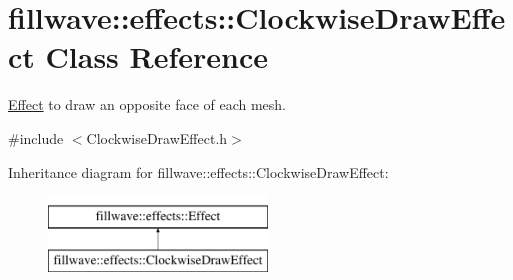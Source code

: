 \hypertarget{classfillwave_1_1effects_1_1ClockwiseDrawEffect}{}\section{fillwave\+:\+:effects\+:\+:Clockwise\+Draw\+Effect Class Reference}
\label{classfillwave_1_1effects_1_1ClockwiseDrawEffect}


\hyperlink{classfillwave_1_1effects_1_1Effect}{Effect} to draw an opposite face of each mesh.  




{\ttfamily \#include $<$Clockwise\+Draw\+Effect.\+h$>$}

Inheritance diagram for fillwave\+:\+:effects\+:\+:Clockwise\+Draw\+Effect\+:\begin{figure}[H]
\begin{center}
\leavevmode
\includegraphics[height=2.000000cm]{classfillwave_1_1effects_1_1ClockwiseDrawEffect}
\end{center}
\end{figure}
